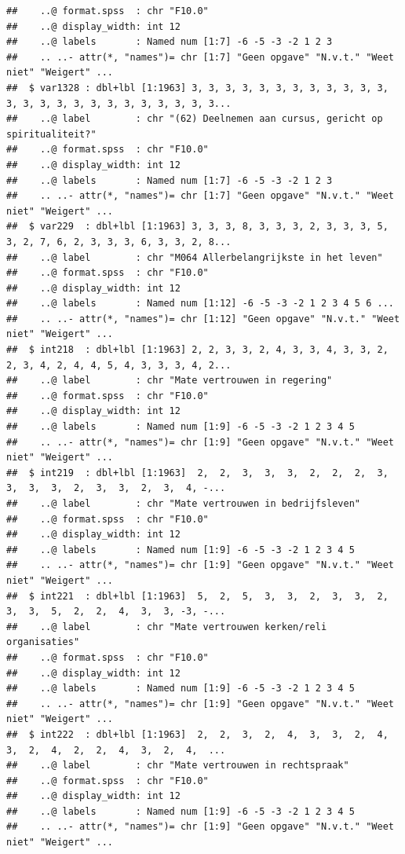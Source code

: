 \documentclass[
]{book}
\begin{document}
\begin{verbatim}
##    ..@ format.spss  : chr "F10.0"
##    ..@ display_width: int 12
##    ..@ labels       : Named num [1:7] -6 -5 -3 -2 1 2 3
##    .. ..- attr(*, "names")= chr [1:7] "Geen opgave" "N.v.t." "Weet niet" "Weigert" ...
##  $ var1328 : dbl+lbl [1:1963] 3, 3, 3, 3, 3, 3, 3, 3, 3, 3, 3, 3, 3, 3, 3, 3, 3, 3, 3, 3, 3, 3, 3, 3, 3...
##    ..@ label        : chr "(62) Deelnemen aan cursus, gericht op spiritualiteit?"
##    ..@ format.spss  : chr "F10.0"
##    ..@ display_width: int 12
##    ..@ labels       : Named num [1:7] -6 -5 -3 -2 1 2 3
##    .. ..- attr(*, "names")= chr [1:7] "Geen opgave" "N.v.t." "Weet niet" "Weigert" ...
##  $ var229  : dbl+lbl [1:1963] 3, 3, 3, 8, 3, 3, 3, 2, 3, 3, 3, 5, 3, 2, 7, 6, 2, 3, 3, 3, 6, 3, 3, 2, 8...
##    ..@ label        : chr "M064 Allerbelangrijkste in het leven"
##    ..@ format.spss  : chr "F10.0"
##    ..@ display_width: int 12
##    ..@ labels       : Named num [1:12] -6 -5 -3 -2 1 2 3 4 5 6 ...
##    .. ..- attr(*, "names")= chr [1:12] "Geen opgave" "N.v.t." "Weet niet" "Weigert" ...
##  $ int218  : dbl+lbl [1:1963] 2, 2, 3, 3, 2, 4, 3, 3, 4, 3, 3, 2, 2, 3, 4, 2, 4, 4, 5, 4, 3, 3, 3, 4, 2...
##    ..@ label        : chr "Mate vertrouwen in regering"
##    ..@ format.spss  : chr "F10.0"
##    ..@ display_width: int 12
##    ..@ labels       : Named num [1:9] -6 -5 -3 -2 1 2 3 4 5
##    .. ..- attr(*, "names")= chr [1:9] "Geen opgave" "N.v.t." "Weet niet" "Weigert" ...
##  $ int219  : dbl+lbl [1:1963]  2,  2,  3,  3,  3,  2,  2,  2,  3,  3,  3,  3,  2,  3,  3,  2,  3,  4, -...
##    ..@ label        : chr "Mate vertrouwen in bedrijfsleven"
##    ..@ format.spss  : chr "F10.0"
##    ..@ display_width: int 12
##    ..@ labels       : Named num [1:9] -6 -5 -3 -2 1 2 3 4 5
##    .. ..- attr(*, "names")= chr [1:9] "Geen opgave" "N.v.t." "Weet niet" "Weigert" ...
##  $ int221  : dbl+lbl [1:1963]  5,  2,  5,  3,  3,  2,  3,  3,  2,  3,  3,  5,  2,  2,  4,  3,  3, -3, -...
##    ..@ label        : chr "Mate vertrouwen kerken/reli organisaties"
##    ..@ format.spss  : chr "F10.0"
##    ..@ display_width: int 12
##    ..@ labels       : Named num [1:9] -6 -5 -3 -2 1 2 3 4 5
##    .. ..- attr(*, "names")= chr [1:9] "Geen opgave" "N.v.t." "Weet niet" "Weigert" ...
##  $ int222  : dbl+lbl [1:1963]  2,  2,  3,  2,  4,  3,  3,  2,  4,  3,  2,  4,  2,  2,  4,  3,  2,  4,  ...
##    ..@ label        : chr "Mate vertrouwen in rechtspraak"
##    ..@ format.spss  : chr "F10.0"
##    ..@ display_width: int 12
##    ..@ labels       : Named num [1:9] -6 -5 -3 -2 1 2 3 4 5
##    .. ..- attr(*, "names")= chr [1:9] "Geen opgave" "N.v.t." "Weet niet" "Weigert" ...

\end{verbatim}
\end{document}
